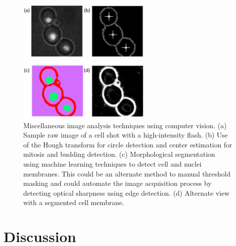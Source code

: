 \documentclass{bioinfo}
\begin{document}
\begin{figure}[!tpb]
\centerline{\includegraphics[width=65mm]{misc.png}}
\caption{Miscellaneous image analysis techniques using computer vision. (a) Sample raw image of a cell shot with a high-intensity flash. (b) Use of the Hough transform for circle detection and center estimation for mitosis and budding detection. (c) Morphological segmentation using machine learning techniques to detect cell and nuclei membranes. This could be an alternate method to manual threshold masking and could automate the image acquisition process by detecting optical sharpness using edge detection. (d) Alternate view with a segmented cell membrane.}\label{fig:12}
\end{figure}

\section{Discussion}
\end{document}
